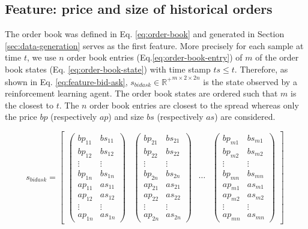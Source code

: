 \subsection{Feature: price and size of historical orders}
The order book was defined in Eq. \ref{eq:order-book} and generated in Section \ref{sec:data-generation} serves as the first feature.
More precisely for each sample at time $t$, we use $n$ order book entries (Eq.\ref{eq:order-book-entry}) of $m$ of the order book states (Eq. \ref{eq:order-book-state}) with time stamp $ts \le t$.
Therefore, as shown in Eq. \ref{eq:feature-bid-ask}, $s_{bidask} \in \mathbb{R^+}^{m\times2\times2n}$ is the state observed by a reinforcement learning agent.
The order book states are ordered such that $m$ is the closest to $t$.
The $n$ order book entries are closest to the spread whereas only the price $bp$ (respectively $ap$) and size $bs$ (respectively $as$) are considered.

\begin{equation}\label{eq:feature-bid-ask}
s_{bidask} =\begin{bmatrix}
{\displaystyle \begin{pmatrix}
bp_{11} & bs_{11}\\
bp_{12} & bs_{12}\\
\vdots  & \vdots \\
bp_{1n} & bs_{1n}\\
ap_{11} & as_{11}\\
ap_{12} & as_{12}\\
\vdots  & \vdots \\
ap_{1n} & as_{1n}
\end{pmatrix}} & \begin{pmatrix}
bp_{21} & bs_{21}\\
bp_{22} & bs_{22}\\
\vdots  & \vdots \\
bp_{2n} & bs_{2n}\\
ap_{21} & as_{21}\\
ap_{22} & as_{22}\\
\vdots  & \vdots \\
ap_{2n} & as_{2n}
\end{pmatrix} & \cdots  & \begin{pmatrix}
bp_{m1} & bs_{m1}\\
bp_{m2} & bs_{m2}\\
\vdots  & \vdots \\
bp_{mn} & bs_{mn}\\
ap_{m1} & as_{m1}\\
ap_{m2} & as_{m2}\\
\vdots  & \vdots \\
ap_{mn} & as_{mn}
\end{pmatrix}
\end{bmatrix} \ 
\end{equation}

